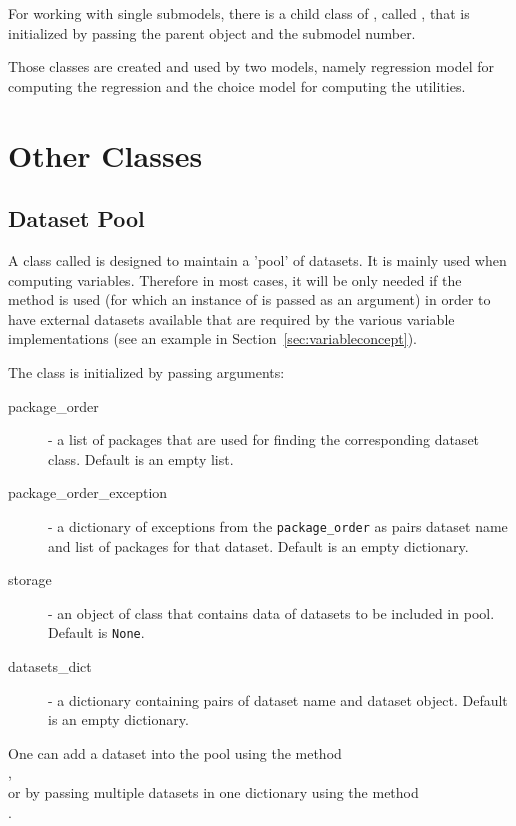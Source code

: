 For working with single submodels, there is a child class of
, called
, that is initialized by passing the
parent object and the submodel number.

Those classes are created and used by two  models, namely regression model
for computing the regression and the choice model for computing the utilities.

\section{Other Classes}
%
\subsection{Dataset Pool}
\label{sec:core-dataset-pool}
%
A class called  is designed to maintain a 'pool' of datasets. It is mainly used when
computing variables. Therefore in most cases, it will be only needed if the  method
 is used (for which an instance of  is passed as an argument) in order
to have external datasets available that are required by the various variable implementations
 (see an example in Section~\ref{sec:variableconcept}).

The class is initialized by passing arguments:
\begin{description}
\item[package_order] - a list of packages that are used for finding the corresponding dataset class. Default is an empty list.
\item[package_order_exception] - a dictionary of exceptions from the \verb|package_order| as pairs dataset name
and list of packages for that dataset. Default is an empty dictionary.
\item[storage] - an object of class  that contains data of datasets to be included in pool. Default is \verb|None|.
\item[datasets_dict] - a dictionary containing pairs of dataset name and dataset object. Default is an empty dictionary.
\end{description}
One can add a dataset into the pool using the method \\
, \\
or by
passing multiple datasets in one dictionary using the method \\
.

